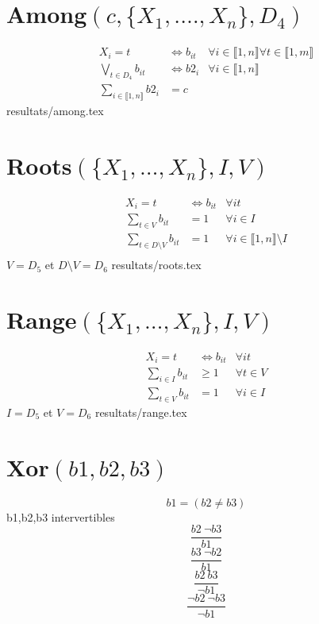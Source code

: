 \documentclass{article}
\newcommand{\roots}{Roots$(\{X_1,\ldots,X_n\},I,V)~$}
\newcommand{\range}{Range$(\{X_1,\ldots,X_n\},I,V)~$}
\newcommand{\among}{Among$(c,\{X_1,.\ldots,X_n\},D_4)~$}
\newcommand{\I}{i\in\llbracket1,n\rrbracket}
\newcommand{\T}{t\in\llbracket1,m\rrbracket}
\newcommand{\fai}{\forall\I}
\newcommand{\fat}{\forall\T}
\newcommand{\fit}{\fai\fat}
\begin{document}
\section{\among}
\begin{align*}
    X_i =t & \iff b_{it}&\fit\\
    \bigvee_{t\in D_4}b_{it}&\iff b2_i&\fai\\
    \sum_{\I}b2_i & =c
\end{align*}
{resultats/among.tex}
\section{\roots}
\begin{align*}
    X_i=t &\iff b_{it}&\forall it\\
    \sum_{t\in V}b_{it} & =1&\forall i \in I\\
    \sum_{t\in D \setminus V}b_{it} & =1&\forall i \in \llbracket1,n\rrbracket \setminus I\\
\end{align*}
$V=D_5$ et $D \setminus V=D_6$
{resultats/roots.tex}
\section{\range}
\begin{align*}
    X_i=t &\iff b_{it}&\forall it\\
    \sum_{i\in I}b_{it} & \geq 1 &\forall t\in V\\
    \sum_{t\in V}b_{it} & =1&\forall i \in I
\end{align*}
$I=D_5$ et $V=D_6$
{resultats/range.tex}
\section{Xor$(b1,b2,b3)$}
$$b1=(b2\neq b3)$$
b1,b2,b3 intervertibles
$$\frac{b2~\neg b3}{b1}$$
$$\frac{b3~\neg b2}{b1}$$
$$\frac{b2~ b3}{\neg b1}$$
$$\frac{\neg b2~\neg b3}{\neg b1}$$
\end{document}
